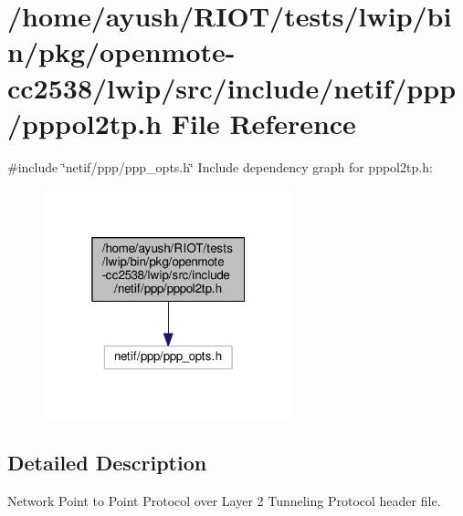 \hypertarget{openmote-cc2538_2lwip_2src_2include_2netif_2ppp_2pppol2tp_8h}{}\section{/home/ayush/\+R\+I\+O\+T/tests/lwip/bin/pkg/openmote-\/cc2538/lwip/src/include/netif/ppp/pppol2tp.h File Reference}
\label{openmote-cc2538_2lwip_2src_2include_2netif_2ppp_2pppol2tp_8h}
{\ttfamily \#include \char`\"{}netif/ppp/ppp\+\_\+opts.\+h\char`\"{}}\newline
Include dependency graph for pppol2tp.\+h\+:
\nopagebreak
\begin{figure}[H]
\begin{center}
\leavevmode
\includegraphics[width=205pt]{openmote-cc2538_2lwip_2src_2include_2netif_2ppp_2pppol2tp_8h__incl}
\end{center}
\end{figure}


\subsection{Detailed Description}
Network Point to Point Protocol over Layer 2 Tunneling Protocol header file. 
